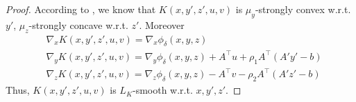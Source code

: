 \documentclass{article}
\theoremstyle{plain}
\theoremstyle{definition}
\theoremstyle{remark}
\begin{document}
\begin{proof}
    According to , we know that $K(x,y',z',u,v)$ is $\mu_y$-strongly convex w.r.t. $y'$, $\mu_z$-strongly concave w.r.t. $z'$. Moreover
    \begin{align*}
        &\nabla_x K(x,y',z',u,v)=\nabla_x \phi_\delta(x,y,z)\\
        &\nabla_y K(x,y',z',u,v)=\nabla_y \phi_\delta(x,y,z)+ A^\top u+\rho_1 A^\top(A'y'-b)\\
        &\nabla_z K(x,y',z',u,v)=\nabla_z \phi_\delta(x,y,z)- A^\top v-\rho_2 A^\top(A'z'-b)
    \end{align*}
    Thus, $K(x,y',z',u,v)$ is $L_K$-smooth w.r.t. $x, y', z'$.
\end{proof}
\end{document}
